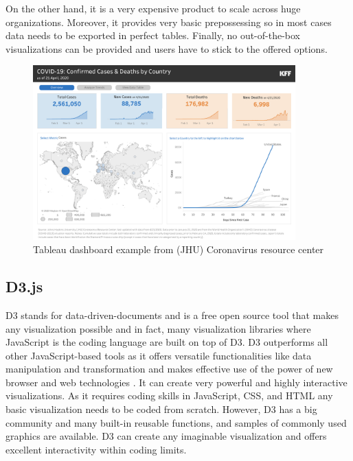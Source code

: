 On the other hand, it is a very expensive product to scale across huge organizations. Moreover, it provides very basic prepossessing so in most cases data needs to be exported in perfect tables. Finally, no out-of-the-box visualizations can be provided and users have to stick to the offered options.


\begin{figure}[H]
\centering
\captionsetup{justification=centering}
\includegraphics[width=0.9\textwidth]{./pics/tableau.png}
\caption{Tableau dashboard example from (JHU) Coronavirus resource center \cite{kff}}
\label{fig:tableau}
\end{figure}



\subsection{D3.js}

D3 stands for data-driven-documents \cite{2011-d3} and is a free open source tool that makes any visualization possible and in fact, many visualization libraries where JavaScript is the coding language are built on top of D3. D3 outperforms all other JavaScript-based tools as it offers versatile functionalities like data manipulation and transformation and makes effective use of the power of new browser and web technologies \cite{nair2016interactive}. It can create very powerful and highly interactive visualizations. As it requires coding skills in JavaScript, CSS, and HTML any basic visualization needs to be coded from scratch. However, D3 has a big community and many built-in reusable functions, and samples of commonly used graphics are available. D3 can create any imaginable visualization and offers excellent interactivity within coding limits. 

